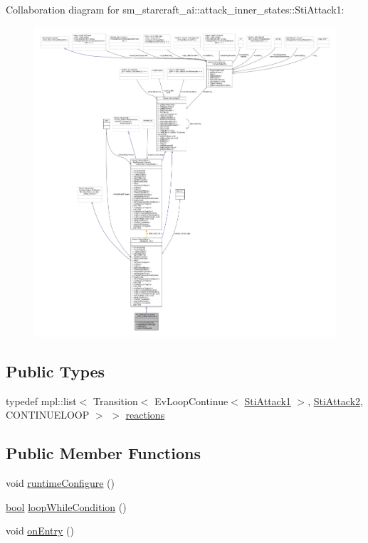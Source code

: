 Collaboration diagram for sm\+\_\+starcraft\+\_\+ai\+:\+:attack\+\_\+inner\+\_\+states\+:\+:Sti\+Attack1\+:
\nopagebreak
\begin{figure}[H]
\begin{center}
\leavevmode
\includegraphics[width=350pt]{structsm__starcraft__ai_1_1attack__inner__states_1_1StiAttack1__coll__graph}
\end{center}
\end{figure}
\subsection*{Public Types}
\begin{DoxyCompactItemize}
\item 
typedef mpl\+::list$<$ Transition$<$ Ev\+Loop\+Continue$<$ \hyperlink{structsm__starcraft__ai_1_1attack__inner__states_1_1StiAttack1}{Sti\+Attack1} $>$, \hyperlink{structsm__starcraft__ai_1_1attack__inner__states_1_1StiAttack2}{Sti\+Attack2}, C\+O\+N\+T\+I\+N\+U\+E\+L\+O\+OP $>$ $>$ \hyperlink{structsm__starcraft__ai_1_1attack__inner__states_1_1StiAttack1_a0aff5f8d7ce463d461248ff39f0265ea}{reactions}
\end{DoxyCompactItemize}
\subsection*{Public Member Functions}
\begin{DoxyCompactItemize}
\item 
void \hyperlink{structsm__starcraft__ai_1_1attack__inner__states_1_1StiAttack1_a9307ca96add505ae839b0f74368474e5}{runtime\+Configure} ()
\item 
\hyperlink{classbool}{bool} \hyperlink{structsm__starcraft__ai_1_1attack__inner__states_1_1StiAttack1_a19b7c513e8353cf16983dad2c18d6aea}{loop\+While\+Condition} ()
\item 
void \hyperlink{structsm__starcraft__ai_1_1attack__inner__states_1_1StiAttack1_a7e67ac9316c3f465eccc32e74012ddf5}{on\+Entry} ()
\end{DoxyCompactItemize}
